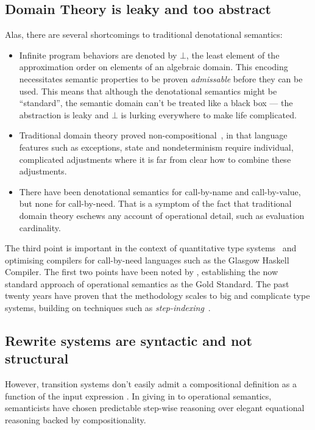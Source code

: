\subsection{Domain Theory is leaky and too abstract}
Alas, there are several shortcomings to traditional denotational semantics:
\begin{itemize}
  \item Infinite program behaviors are denoted by $\bot$, the least element of
        the approximation order on elements of an algebraic domain.
        This encoding necessitates semantic properties to be proven
        \emph{admissable} before they can be used. This means that although
        the denotational semantics might be ``standard'', the semantic domain
        can't be treated like a black box --- the abstraction is leaky and
        $\bot$ is lurking everywhere to make life complicated.
  \item Traditional domain theory proved non-compositional~\citep{WrightFelleisen:94},
        in that language features such as exceptions, state and nondeterminism
        require individual, complicated adjustments where it is far from clear
        how to combine these adjustments.
  \item There have been denotational semantics for call-by-name and
        call-by-value, but none for call-by-need. That is a symptom of the fact
        that traditional domain theory eschews any account of operational
        detail, such as evaluation cardinality.
\end{itemize}

The third point is important in the context of quantitative type
systems~\citep{Atkey:18} and optimising compilers for call-by-need languages such
as the Glasgow Haskell Compiler.
The first two points have been noted by \citet{WrightFelleisen:94}, establishing
the now standard approach of operational semantics as the Gold Standard.
The past twenty years have proven that the methodology scales to
big and complicate type systems, building on techniques such as
\emph{step-indexing}~\citep{AppelMcAllester:01,DreyerAhmedBirkedal:11}.

\subsection{Rewrite systems are syntactic and not structural}
However, transition systems don't easily admit a compositional definition as a
function of the input expression . In giving in to operational
semantics, semanticists have chosen predictable step-wise reasoning over elegant
equational reasoning backed by compositionality.

